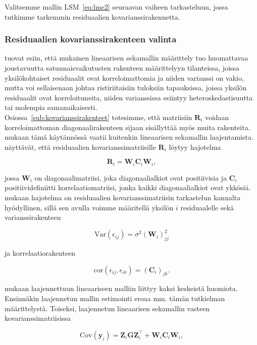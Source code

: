 \documentclass[finnish]{docopts}
\begin{document}
Valitsemme mallin LSM~\ref{eq:lme2} seuraavan vaiheen tarkasteluun, jossa tutkimme tarkemmin residuaalien kovarianssirakennetta.

\subsubsection{Residuaalien kovarianssirakenteen valinta}
\label{ssb:reskovar}

\cite{pinheiro00} tuovat esiin, että \cite{laird82} mukainen lineaarisen sekamallin määrittely tuo huomattavaa joustavuutta satunnaisvaikutusten rakenteen määrittelyyn tilanteissa, joissa yksilökohtaiset residuaalit ovat korreloimattomia ja niiden varianssi on vakio, mutta voi sellaisenaan johtaa ristiriitaisiin tuloksiin tapauksissa, joissa yksilön residuaalit ovat korreloituneita, niiden varianssissa esiintyy heteroskedastisuutta tai molempia samanaikaisesti.\\

Osiossa~\ref{sub:kovarianssirakenteet} totesimme, että matriisiin $\bm{R}_i$ voidaan korreloimattoman diagonaalirakenteen sijaan sisällyttää myös muita rakenteita. \cite{pinheiro00} mukaan tämä käytännössä vaatii kuitenkin lineaarisen sekamallin laajentamista.\\

\cite{pinheiro00} näyttävät, että residuaalien kovarianssimatriisille $\bm{R}_i$ löytyy hajotelma

$$
\bm{R}_i = \bm{W}_i \bm{C}_i \bm{W}_i,
$$

jossa $\bm{W}_i$ on diagonaalimatriisi, joka diagonaalialkiot ovat positiivisia ja $\bm{C}_i$ positiividefiniitti korrelaatiomatriisi, jonka kaikki diagonaalialkiot ovat ykkösiä. \cite{pinheiro00} mukaan hajotelma on residuaalien kovarianssimatriisin tarkastelun kannalta hyödyllinen, sillä sen avulla voimme määritellä yksilön $i$ residuaalelle sekä varianssirakenteen 

$$
\text{Var}(\epsilon_{ij}) = \sigma^2(\bm{W}_i)^2_{jj}
$$

ja korrelaatiorakenteen

$$
\text{cor}(\epsilon_{ij}, \epsilon_{ik}) = (\bm{C}_i)_{jk}.
$$

\cite{pinheiro00} mukaan laajennettuun lineaariseen malliin liittyy kaksi keskeistä huomiota. Ensinnäkin laajennetun mallin estimointi eroaa mm. tämän tutkielman määrittelystä. Toiseksi, laajennetun lineaarisen sekamallin vasteen kovarianssimatriisissa

$$
\text{Cov}(\bm{y}_i) = \bm{Z}_i \bm{G} \bm{Z}_i^\top +  \bm{W}_i \bm{C}_i \bm{W}_i,
$$
\end{document}
